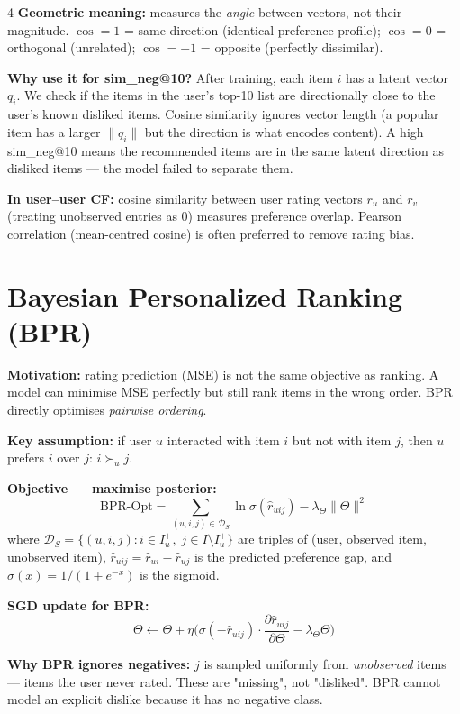 \documentclass[9pt,a4paper,landscape]{article}
\begin{document}
\begin{multicols}{4}
\textbf{Geometric meaning:} measures the \emph{angle} between vectors, not their magnitude. $\cos=1$ = same direction (identical preference profile); $\cos=0$ = orthogonal (unrelated); $\cos=-1$ = opposite (perfectly dissimilar).

\textbf{Why use it for sim\_neg@10?} After training, each item $i$ has a latent vector $q_i$. We check if the items in the user's top-10 list are directionally close to the user's known disliked items. Cosine similarity ignores vector length (a popular item has a larger $\|q_i\|$ but the direction is what encodes content). A high sim\_neg@10 means the recommended items are in the same latent direction as disliked items — the model failed to separate them.

\textbf{In user--user CF:} cosine similarity between user rating vectors $r_u$ and $r_v$ (treating unobserved entries as 0) measures preference overlap. Pearson correlation (mean-centred cosine) is often preferred to remove rating bias.

\section{Bayesian Personalized Ranking (BPR)}

\textbf{Motivation:} rating prediction (MSE) is not the same objective as ranking. A model can minimise MSE perfectly but still rank items in the wrong order. BPR directly optimises \emph{pairwise ordering}.

\textbf{Key assumption:} if user $u$ interacted with item $i$ but not with item $j$, then $u$ prefers $i$ over $j$: $i \succ_u j$.

\textbf{Objective — maximise posterior:}
\[
\text{BPR-Opt} = \sum_{(u,i,j)\in\mathcal{D}_S} \ln \sigma(\hat{r}_{uij}) - \lambda_\Theta \|\Theta\|^2
\]
where $\mathcal{D}_S = \{(u,i,j): i\in I_u^+,\; j\in I\setminus I_u^+\}$ are triples of (user, observed item, unobserved item), $\hat{r}_{uij} = \hat{r}_{ui} - \hat{r}_{uj}$ is the predicted preference gap, and $\sigma(x) = 1/(1+e^{-x})$ is the sigmoid.

\textbf{SGD update for BPR:}
\[
\Theta \leftarrow \Theta + \eta \Big(\sigma(-\hat{r}_{uij})\cdot\frac{\partial \hat{r}_{uij}}{\partial \Theta} - \lambda_\Theta\Theta\Big)
\]

\textbf{Why BPR ignores negatives:} $j$ is sampled uniformly from \emph{unobserved} items — items the user never rated. These are "missing", not "disliked". BPR cannot model an explicit dislike because it has no negative class.


\end{multicols}
\end{document}
